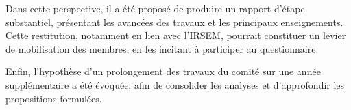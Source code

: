 \documentclass[12pt,a4paper]{article}
\begin{document}
Dans cette perspective, il a été proposé de produire un rapport d'étape substantiel, présentant les avancées des travaux et les principaux enseignements. Cette restitution, notamment en lien avec l'IRSEM, pourrait constituer un levier de mobilisation des membres, en les incitant à participer au questionnaire.

Enfin, l'hypothèse d'un prolongement des travaux du comité sur une année supplémentaire a été évoquée, afin de consolider les analyses et d'approfondir les propositions formulées.




\end{document}
